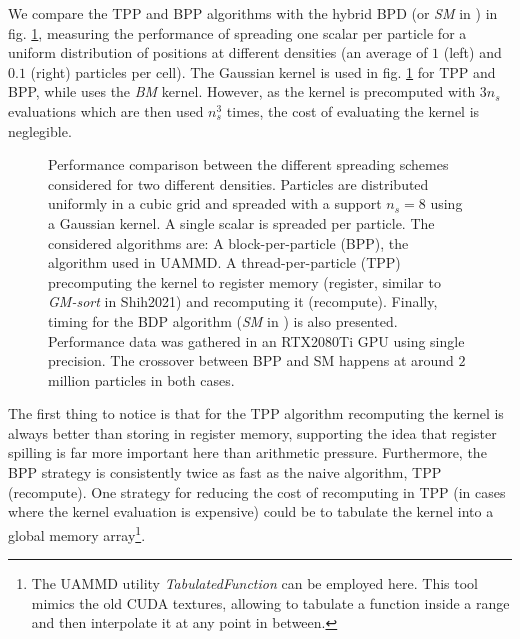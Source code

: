 \documentclass[ twoside,openright,titlepage,numbers=noenddot,%
headinclude,footinclude,cleardoublepage=empty,abstract=on,
BCOR=5mm,paper=a4,fontsize=11pt, dvipsnames
]{scrreprt}
\newcommand{\uammd}{\gls{UAMMD}\xspace}
\newcommand{\gpu}{\gls{GPU}\xspace}
\begin{document}
We compare the TPP and BPP algorithms with the hybrid BPD (or \emph{SM} in \cite{Shih2021}) in fig. \ref{fig:ibmcomp}, measuring the performance of spreading one scalar per particle for a uniform distribution of positions at different densities (an average of $1$ (left) and $0.1$ (right) particles per cell). The Gaussian kernel is used in fig. \ref{fig:ibmcomp} for TPP and BPP, while \cite{Shih2021} uses the \emph{BM} kernel. However, as the kernel is precomputed with $3n_s$ evaluations which are then used $n_s^3$ times, the cost of evaluating the kernel is neglegible.

\begin{figure}[h]
  \centering
\caption{Performance comparison between the different spreading schemes considered for two different densities. Particles are distributed uniformly in a cubic grid and spreaded with a support $n_s=8$ using a Gaussian kernel. A single scalar is spreaded per particle. The considered algorithms are: A block-per-particle (BPP), the algorithm used in \uammd. A thread-per-particle (TPP) precomputing the kernel to register memory (register, similar to \emph{GM-sort} in Shih2021\cite{Shih2021}) and recomputing it (recompute). Finally, timing for the BDP algorithm (\emph{SM} in \cite{Shih2021}) is also presented. Performance data was gathered in an RTX2080Ti \gpu using single precision. The crossover between BPP and SM happens at around $2$ million particles in both cases.}
\label{fig:ibmcomp}
\end{figure}
The first thing to notice is that for the TPP algorithm recomputing the kernel is always better than storing in register memory, supporting the idea that register spilling is far more important here than arithmetic pressure. Furthermore, the BPP strategy is consistently twice as fast as the naive algorithm, TPP (recompute). One strategy for reducing the cost of recomputing in TPP (in cases where the kernel evaluation is expensive) could be to tabulate the kernel into a global memory array\footnote{The \uammd utility \emph{TabulatedFunction} can be employed here. This tool mimics the old CUDA textures, allowing to tabulate a function inside a range and then interpolate it at any point in between.}.
\end{document}
